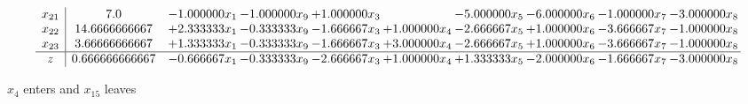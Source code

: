 \documentclass[10pt]{article}
\begin{document}
\[\begin{array}{c| c c@{\hskip 2pt} c@{\hskip 2pt} c@{\hskip 2pt} c@{\hskip 2pt} c@{\hskip 2pt} c@{\hskip 2pt} c@{\hskip 2pt} c@{\hskip 2pt} }
 x_{21}   &  7.0 & -1.000000 x_{1} & -1.000000 x_{9} & + 1.000000 x_{3} &   & -5.000000 x_{5} & -6.000000 x_{6} & -1.000000 x_{7} & -3.000000 x_{8}\\
 x_{22}   &  14.6666666667 & + 2.333333 x_{1} & -0.333333 x_{9} & -1.666667 x_{3} & + 1.000000 x_{4} & -2.666667 x_{5} & + 1.000000 x_{6} & -3.666667 x_{7} & -1.000000 x_{8}\\
 x_{23}   &  3.66666666667 & + 1.333333 x_{1} & -0.333333 x_{9} & -1.666667 x_{3} & + 3.000000 x_{4} & -2.666667 x_{5} & + 1.000000 x_{6} & -3.666667 x_{7} & -1.000000 x_{8}\\
\hline
z    &  0.666666666667 & -0.666667 x_{1} & -0.333333 x_{9} & -2.666667 x_{3} & + 1.000000 x_{4} & + 1.333333 x_{5} & -2.000000 x_{6} & -1.666667 x_{7} & -3.000000 x_{8}\\
\end{array}\]


 $ x_{4} $ enters and $ x_{15} $ leaves 
\end{document}

